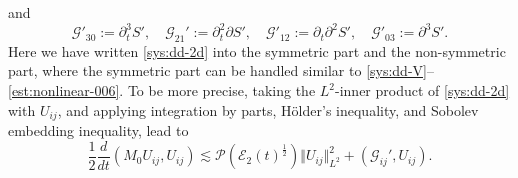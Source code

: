 \documentclass[reqno,11pt]{amsart}
\newcommand{\norm}[2]{\Vert #1 \Vert_{#2}}
\theoremstyle{plain}
\theoremstyle{definition}
\numberwithin{equation}{section}
\begin{document}
and 
\begin{equation}
    \mathcal{G}'_{30}:=\partial_t^3 S', \quad \mathcal{G}_{21}':=\partial_t^2 \partial S', \quad \mathcal{G}'_{12}:=\partial_t \partial^2 S', \quad \mathcal{G}'_{03}:=\partial^3 S'.
\end{equation}
Here we have written \eqref{sys:dd-2d} into the symmetric part and the non-symmetric part, where the symmetric part can be handled similar to \eqref{sys:dd-V}--\eqref{est:nonlinear-006}. To be more precise, taking the $ L^2 $-inner product of \eqref{sys:dd-2d} with $ U_{ij} $, and applying integration by parts, H\"older's inequality, and Sobolev embedding inequality, lead to 
\begin{equation}
\label{est:2d-U-ij}
    \frac{1}{2}\dfrac{d}{dt}(M_0 U_{ij}, U_{ij}) \lesssim \mathcal P(\mathcal E_2(t)^{\frac{1}{2}}) \norm{U_{ij}}{L^2}^2 + (\mathcal G_{ij}', U_{ij}). 
\end{equation}

\end{document}

